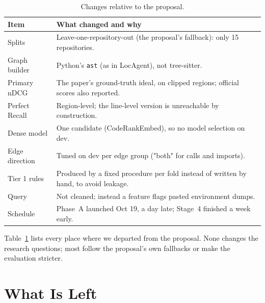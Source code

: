 \documentclass[11pt]{article}
\begin{document}
\begin{table}[t]
\centering
\small
\begin{tabularx}{\columnwidth}{@{}l X@{}}
\toprule
Item & What changed and why \\
\midrule
Splits & Leave-one-repository-out (the proposal's fallback): only 15 repositories. \\
Graph builder & Python's \texttt{ast} (as in LocAgent), not tree-sitter. \\
Primary nDCG & The paper's ground-truth ideal, on clipped regions; official scores also reported. \\
Perfect Recall & Region-level; the line-level version is unreachable by construction. \\
Dense model & One candidate (CodeRankEmbed), so no model selection on dev. \\
Edge direction & Tuned on dev per edge group ("both" for calls and imports). \\
Tier 1 rules & Produced by a fixed procedure per fold instead of written by hand, to avoid leakage. \\
Query & Not cleaned; instead a feature flags pasted environment dumps. \\
Schedule & Phase~A launched Oct 19, a day late; Stage~4 finished a week early. \\
\bottomrule
\end{tabularx}
\caption{Changes relative to the proposal.}
\label{tab:dev}
\end{table}

Table~\ref{tab:dev} lists every place where we departed from the proposal.
None changes the research questions; most follow the proposal's own fallbacks
or make the evaluation stricter.

\section{What Is Left}
\label{sec:left}
\end{document}
